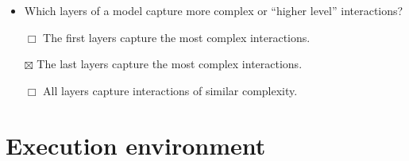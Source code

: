 \documentclass[11pt, twoside]{article}
\begin{document}
\begin{itemize}
\item
  Which layers of a model capture more complex or ``higher level''
  interactions?

  \(\Box\) The first layers capture the most complex interactions.

  \(\boxtimes\) The last layers capture the most complex interactions.

  \(\Box\) All layers capture interactions of similar complexity.
\end{itemize}

    \hypertarget{execution-environment}{%
\section{Execution environment}\label{execution-environment}}
\end{document}

